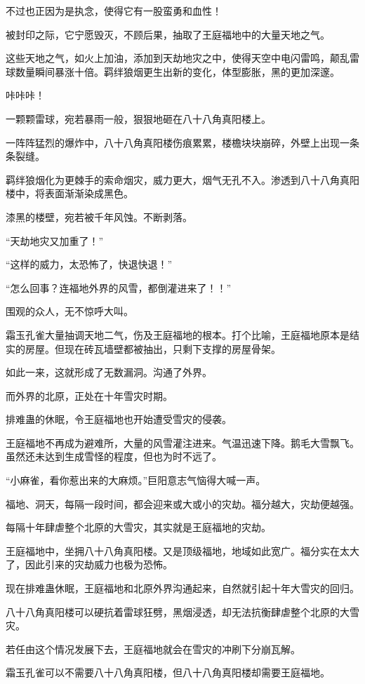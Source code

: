 \begin{this_body}
不过也正因为是执念，使得它有一股蛮勇和血性！

被封印之际，它宁愿毁灭，不顾后果，抽取了王庭福地中的大量天地之气。

这些天地之气，如火上加油，添加到天劫地灾之中，使得天空中电闪雷鸣，颠乱雷球数量瞬间暴涨十倍。羁绊狼烟更生出新的变化，体型膨胀，黑的更加深邃。

咔咔咔！

一颗颗雷球，宛若暴雨一般，狠狠地砸在八十八角真阳楼上。

一阵阵猛烈的爆炸中，八十八角真阳楼伤痕累累，楼檐块块崩碎，外壁上出现一条条裂缝。

羁绊狼烟化为更棘手的索命烟灾，威力更大，烟气无孔不入。渗透到八十八角真阳楼中，将表面渐渐染成黑色。

漆黑的楼壁，宛若被千年风蚀。不断剥落。

“天劫地灾又加重了！”

“这样的威力，太恐怖了，快退快退！”

“怎么回事？连福地外界的风雪，都倒灌进来了！！”

围观的众人，无不惊呼大叫。

霜玉孔雀大量抽调天地二气，伤及王庭福地的根本。打个比喻，王庭福地原本是结实的房屋。但现在砖瓦墙壁都被抽出，只剩下支撑的房屋骨架。

如此一来，这就形成了无数漏洞。沟通了外界。

而外界的北原，正处在十年雪灾时期。

排难蛊的休眠，令王庭福地也开始遭受雪灾的侵袭。

王庭福地不再成为避难所，大量的风雪灌注进来。气温迅速下降。鹅毛大雪飘飞。虽然还未达到生成雪怪的程度，但也为时不远了。

“小麻雀，看你惹出来的大麻烦。”巨阳意志气恼得大喊一声。

福地、洞天，每隔一段时间，都会迎来或大或小的灾劫。福分越大，灾劫便越强。

每隔十年肆虐整个北原的大雪灾，其实就是王庭福地的灾劫。

王庭福地中，坐拥八十八角真阳楼。又是顶级福地，地域如此宽广。福分实在太大了，因此引来的灾劫威力也极为恐怖。

现在排难蛊休眠，王庭福地和北原外界沟通起来，自然就引起十年大雪灾的回归。

八十八角真阳楼可以硬抗着雷球狂劈，黑烟浸透，却无法抗衡肆虐整个北原的大雪灾。

若任由这个情况发展下去，王庭福地就会在雪灾的冲刷下分崩瓦解。

霜玉孔雀可以不需要八十八角真阳楼，但八十八角真阳楼却需要王庭福地。


\end{this_body}
